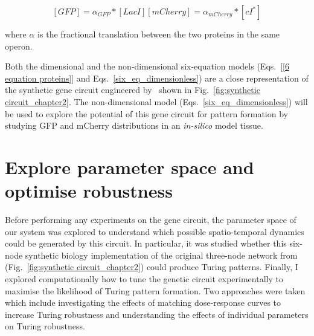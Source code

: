 \begin{subequations}
    \begin{equation}
        [GFP] = \alpha_{GFP}*[LacI]
    \end{equation}
    \begin{equation}
        [mCherry] = \alpha_{mCherry}*[cI^*]
    \end{equation}
    \label{linear_fluorescence}
\end{subequations}

where $\alpha$ is the fractional translation between the two proteins in the same operon.


Both the dimensional and the non-dimensional six-equation models
(Eqs.~\ref{[6 equation proteins]} and Eqs.~\ref{six_eq_dimensionless})
are a close representation of the synthetic gene circuit engineered
by~\cite{Tica2020} shown in Fig.~\ref{fig:synthetic circuit_chapter2}.
The non-dimensional model (Eqs.~\ref{six_eq_dimensionless})
will be used to explore the potential of this gene circuit for pattern formation by studying GFP and mCherry distributions in an \textit{in-silico} model tissue.



\section{Explore parameter space and optimise robustness}
Before performing any experiments on the gene circuit,
the parameter space of our system was explored
to understand which possible spatio-temporal dynamics could be generated by this circuit.
In particular, it was studied
whether this six-node synthetic biology implementation of the original three-node network from~\cite{Scholes2019} (Fig.~\ref{fig:synthetic circuit_chapter2}) could produce Turing patterns.
Finally,
I explored computationally
how to tune the genetic circuit experimentally to maximise the likelihood of Turing pattern formation.
Two approaches were taken
which include
investigating the effects of matching dose-response curves to increase Turing robustness
and understanding the effects of individual parameters on Turing robustness.

